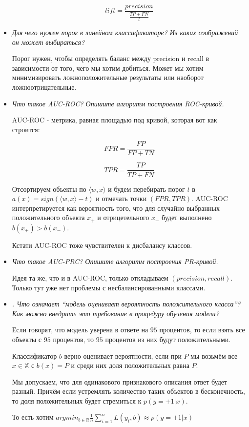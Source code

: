 \documentclass[a4paper]{article}
\begin{document}
\begin{itemize}
\[ lift = \frac{precision}{\frac{TP+FN}{l}} \]

\item \textit{Для чего нужен порог в линейном классификаторе? Из каких соображений он может
выбираться?}

Порог нужен, чтобы определять баланс между precision и recall в зависимости от того, чего мы хотим добиться.
Может мы хотим минимизировать ложноположительные результаты или наоборот ложноотрицательные.

\item \textit{Что такое AUC-ROC? Опишите алгоритм построения ROC-кривой.}

AUC-ROC - метрика, равная площадью под кривой, которая вот как строится:

\[ FPR = \frac{FP}{FP+TN} \]

\[ TPR = \frac{TP}{TP+FN} \]

Отсортируем объекты по $\langle w, x \rangle$ и будем перебирать порог $t$ в $a(x) = sign(\langle w, x \rangle - t)$ и отмечать точки $(FPR, TPR)$.
AUC-ROC интерпретируется как вероятность того, что для случайно выбранных положительного объекта $x_+$ и отрицетельного $x_-$ будет выполнено $b(x_+) > b(x_-)$.

Кстати AUC-ROC тоже чувствителен к дисбалансу классов.


\item \textit{Что такое AUC-PRC? Опишите алгоритм построения PR-кривой.}

Идея та же, что и в AUC-ROC, только откладываем $(precision, recall)$. Только тут уже нет проблемы с несбалансированными классами.

\item \textit{. Что означает “модель оценивает вероятность положительного класса”? Как можно
внедрить это требование в процедуру обучения модели?}

Если говорят, что модель уверена в ответе на $95$ процентов, то если взять все объекты с $95$ процентов, то $95$ процентов из них будут положительными.

Классификатор $b$ верно оценивает вероятности, если при $P$ мы возьмём все $x \in \mathbb{X}$ с $b(x) = P$ и среди них доля положительных равна $P$.

Мы допускаем, что для одинакового признакового описания ответ будет разный. Причём если устремлять количество таких объектов в бесконечность, то доля положительных будет стремиться к $p(y=+1|x)$.

То есть хотим $argmin_{b \in \mathbb{R}} \frac{1}{n} \sum_{i=1}^n L(y_i, b) \approx p(y=+1|x)$


\end{itemize}
\end{document}

